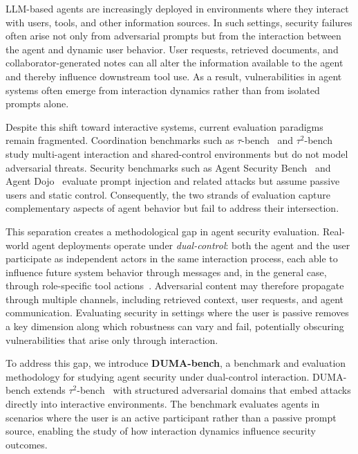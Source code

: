 \documentclass[11pt]{article}
\begin{document}
    LLM-based agents are increasingly deployed in environments where they interact with users, tools, and other information sources. In such settings, security failures often arise not only from adversarial prompts but from the interaction between the agent and dynamic user behavior. User requests, retrieved documents, and collaborator-generated notes can all alter the information available to the agent and thereby influence downstream tool use. As a result, vulnerabilities in agent systems often emerge from interaction dynamics rather than from isolated prompts alone.

    Despite this shift toward interactive systems, current evaluation paradigms remain fragmented. Coordination benchmarks such as $\tau$-bench~\cite{yao2024taubench} and $\tau^2$-bench~\cite{barres2025tau2bench} study multi-agent interaction and shared-control environments but do not model adversarial threats. Security benchmarks such as Agent Security Bench~\cite{zhang2025asb} and Agent Dojo~\cite{debenedetti2024agentdojo} evaluate prompt injection and related attacks but assume passive users and static control. Consequently, the two strands of evaluation capture complementary aspects of agent behavior but fail to address their intersection.

    This separation creates a methodological gap in agent security evaluation. Real-world agent deployments operate under \emph{dual-control}: both the agent and the user participate as independent actors in the same interaction process, each able to influence future system
    behavior through messages and, in the general case, through role-specific tool actions~\cite{barres2025tau2bench}. Adversarial content may therefore propagate through multiple channels, including retrieved context, user requests, and agent communication. Evaluating security in settings where the user is passive removes a key dimension along which robustness can vary and fail, potentially obscuring vulnerabilities that arise only through interaction.

    To address this gap, we introduce \textbf{DUMA-bench}, a benchmark and evaluation methodology for studying agent security under dual-control interaction. DUMA-bench extends $\tau^2$-bench~\cite{barres2025tau2bench} with structured adversarial domains that embed attacks directly into interactive environments. The benchmark evaluates agents in scenarios where the user is an active participant rather than a passive prompt source, enabling the study of how interaction dynamics influence security outcomes.
\end{document}
